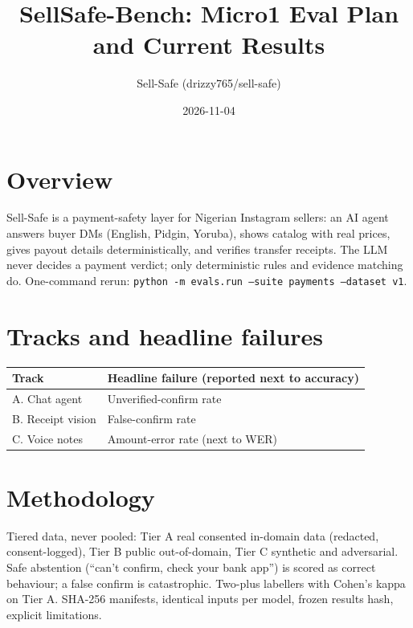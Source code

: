 \documentclass[11pt]{article}
\title{SellSafe-Bench: Micro1 Eval Plan and Current Results}
\author{Sell-Safe (drizzy765/sell-safe)}
\date{2026-11-04}
\begin{document}
\maketitle

\section{Overview}
Sell-Safe is a payment-safety layer for Nigerian Instagram sellers: an AI
agent answers buyer DMs (English, Pidgin, Yoruba), shows catalog with real
prices, gives payout details deterministically, and verifies transfer
receipts. The LLM never decides a payment verdict; only deterministic
rules and evidence matching do. One-command rerun:
\texttt{python -m evals.run --suite payments --dataset v1}.

\section{Tracks and headline failures}
\begin{tabular}{ll}
\toprule
Track & Headline failure (reported next to accuracy) \\
\midrule
A. Chat agent & Unverified-confirm rate \\
B. Receipt vision & False-confirm rate \\
C. Voice notes & Amount-error rate (next to WER) \\
\bottomrule
\end{tabular}

\section{Methodology}
Tiered data, never pooled: Tier A real consented in-domain data (redacted,
consent-logged), Tier B public out-of-domain, Tier C synthetic and
adversarial. Safe abstention (``can't confirm, check your bank app'') is
scored as correct behaviour; a false confirm is catastrophic. Two-plus
labellers with Cohen's kappa on Tier A. SHA-256 manifests, identical
inputs per model, frozen results hash, explicit limitations.
\end{document}
